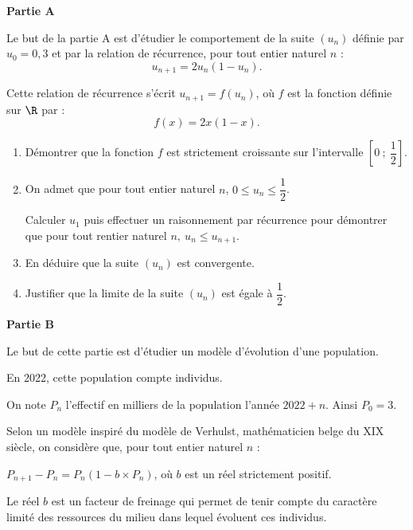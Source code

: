\medskip

\textbf{Partie A}

\medskip

Le but de la partie A est d'étudier le comportement de la suite $\left(u_n\right)$ définie par $u_0 =  0,3$ et par la relation de récurrence, pour tout entier naturel $n$ :
\[u_{n+1} =  2u_n\left(1 - u_n\right).\]

Cette relation de récurrence s'écrit $u_{n+1} =  f\left(u_n\right)$, où $f$ est la fonction définie sur $\R$ par : 
\[f(x) = 2x\left (1 - x\right ).\]

\smallskip
\begin{enumerate}
\item Démontrer que la fonction $f$ est strictement croissante sur l'intervalle $\left[0~;~\dfrac12\right]$.
\item On admet que pour tout entier naturel $n$, $0 \leqslant u_n \leqslant \dfrac12$.

Calculer $u_1$ puis effectuer un raisonnement par récurrence pour démontrer que pour tout rentier naturel $n,\: u_n \leqslant u_{n+1}$.
\item En déduire que la suite $\left(u_n\right)$ est convergente.
\item Justifier que la limite de la suite $\left(u_n\right)$ est égale à $\dfrac12$.
\end{enumerate}

\bigskip

\textbf{Partie B}

\medskip

Le but de cette partie est d'étudier un modèle d'évolution d'une population.

En 2022, cette population compte  individus.

\smallskip

On note $P_n$ l'effectif en milliers de la population l'année $2022 + n$. Ainsi $P_0 = 3$.

Selon un modèle inspiré du modèle de Verhulst, mathématicien belge du XIX siècle, on considère que, pour tout entier naturel $n$ :

\begin{center}$P_{n+1} -  P_n = P_n\left(1 -  b \times P_n\right)$, où $b$ est un réel strictement positif.\end{center}

Le réel $b$ est un facteur de freinage qui permet de tenir compte du caractère limité des
ressources du milieu dans lequel évoluent ces individus.

